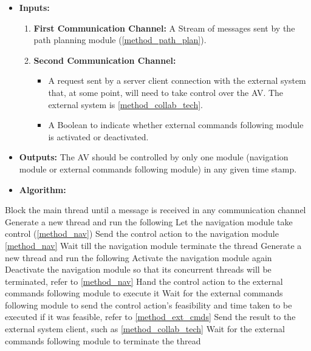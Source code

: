 \begin{itemize}
    \item \textbf{Inputs: }
    \begin{enumerate}
        \item \textbf{First Communication Channel:} A Stream of messages sent by the path planning module (\ref{method_path_plan}).
        \item \textbf{Second Communication Channel:}
        \begin{itemize}
            \item A request sent by a server client connection with the external system that, at some point, will need to take control over the AV. The external system is \ref{method_collab_tech}.
            \item A Boolean to indicate whether external commands following module is activated or deactivated. 
        \end{itemize}
    \end{enumerate}
    \item \textbf{Outputs:} The AV should be controlled by only one module (navigation module or external commands following module) in any given time stamp.
    \item \textbf{Algorithm: }
    \end{itemize}
                \begin{algorithm}[H]
                \SetAlgoLined
                {
                Block the main thread until a message is received in any communication channel\;
                {
                Generate a new thread and run the following\;
                Let the navigation module take control (\ref{method_nav})\;
                Send the control action to the navigation module \ref{method_nav}\;
                Wait till the navigation module terminate the thread\;
                }
                {Generate a new thread and run the following\;
                {Activate the navigation module again\;}
                {Deactivate the navigation module so that its concurrent threads will be terminated, refer to \ref{method_nav}\;
                Hand the control action to the external commands following module to execute it\;
                Wait for the external commands following module to send the control action's feasibility and time taken to be executed if it was feasible, refer to \ref{method_ext_cmds}\;
                Send the result to the external system client, such as \ref{method_collab_tech}\;}
                Wait for the external commands following module to terminate the thread\;
                }
                }
                \caption{High-Level Control Master Algorithm}
            \end{algorithm}

